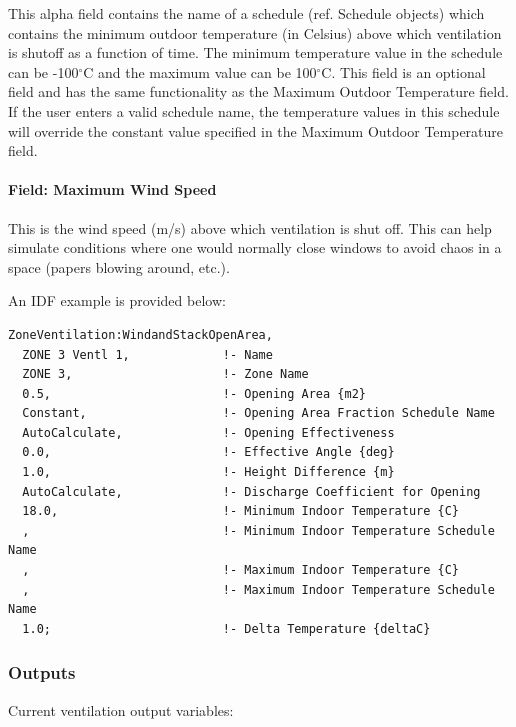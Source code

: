 This alpha field contains the name of a schedule (ref. Schedule objects) which contains the minimum outdoor temperature (in Celsius) above which ventilation is shutoff as a function of time. The minimum temperature value in the schedule can be -100$^\circ$C and the maximum value can be 100$^\circ$C. This field is an optional field and has the same functionality as the Maximum Outdoor Temperature field. If the user enters a valid schedule name, the temperature values in this schedule will override the constant value specified in the Maximum Outdoor Temperature field.

\paragraph{Field: Maximum Wind Speed}\label{field-maximum-wind-speed-1}

This is the wind speed (m/s) above which ventilation is shut off. This can help simulate conditions where one would normally close windows to avoid chaos in a space (papers blowing around, etc.).

An IDF example is provided below:

\begin{lstlisting}
ZoneVentilation:WindandStackOpenArea,
  ZONE 3 Ventl 1,             !- Name
  ZONE 3,                     !- Zone Name
  0.5,                        !- Opening Area {m2}
  Constant,                   !- Opening Area Fraction Schedule Name
  AutoCalculate,              !- Opening Effectiveness
  0.0,                        !- Effective Angle {deg}
  1.0,                        !- Height Difference {m}
  AutoCalculate,              !- Discharge Coefficient for Opening
  18.0,                       !- Minimum Indoor Temperature {C}
  ,                           !- Minimum Indoor Temperature Schedule Name
  ,                           !- Maximum Indoor Temperature {C}
  ,                           !- Maximum Indoor Temperature Schedule Name
  1.0;                        !- Delta Temperature {deltaC}
\end{lstlisting}

\subsubsection{Outputs}\label{outputs-1-002}

Current ventilation output variables:

